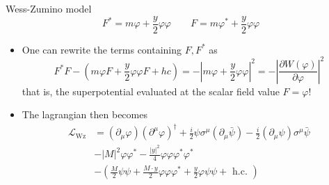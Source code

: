 \documentclass[10pt]{beamer}
\begin{document}
\begin{frame}{Wess-Zumino model}
    \begin{equation*}
        F^{*} = m\varphi + \frac{y}{2}\varphi\varphi \qquad F = m \varphi^{*} + \frac{y}{2} \varphi \varphi
    \end{equation*}
    \begin{itemize}
        \item One can rewrite the terms containing $F, F^{*}$ as  
        \begin{equation*}
            F^{*} F-\left(m \varphi F+\frac{y}{2} \varphi \varphi F+h c\right)=-\left|m \varphi+\frac{y}{2} \varphi \varphi\right|^{2}=-\left|\frac{\partial W(\varphi)}{\partial \varphi}\right|^{2}
        \end{equation*}
        that is, the superpotential evaluated at the scalar field value $F = \varphi$!
        \item The lagrangian then becomes
        \begin{equation*}
            \begin{aligned}
                \mathcal{L}_{\mathrm{Wz}} &=\left(\partial_{\mu} \varphi\right)\left(\partial^{\mu} \varphi\right)^{\dagger}+\frac{i}{2} \psi \sigma^{\mu}\left(\partial_{\mu} \bar{\psi}\right)-\frac{i}{2}\left(\partial_{\mu} \psi\right) \sigma^{\mu} \bar{\psi} \\
                &-|M|^{2} \varphi \varphi^*-\frac{|y|^{2}}{4} \varphi \varphi \varphi^* \varphi^* \\
                &- \left(\frac{M}{2} \psi \psi+\frac{M \cdot y}{2} \varphi \varphi \varphi^*+\frac{y}{2} \varphi \psi \psi+\text { h.c. }\right)
                \end{aligned}
        \end{equation*}
        
        \end{itemize}
\end{frame}
\end{document}
